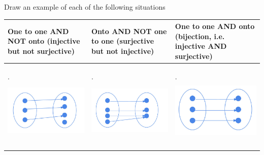 \question Draw an example of each of the following situations \newline
{\tabulinesep=1mm
\begin{tabu}{|p{5cm} | p{5cm}| p{5cm}|}
\hline
One to one AND NOT onto (injective but not surjective) & Onto 
AND NOT one to one (surjective but not injective) & One to one 
AND onto (bijection, i.e. injective AND surjective)\\  
\hline
\begin{solution}[1 in] .\newline \includegraphics[width=4.5cm, height=30mm]{draw_injection.jpg} 
\end{solution} &  \begin{solution}[1 in] .\newline  \includegraphics[width=4.5cm, height=30mm]{draw_surjection.jpg} \end{solution} &  \begin{solution}[1 in] .\newline \includegraphics[width=4.5cm, height=30mm]{draw_bijection.jpg} \end{solution} \\
\hline
\end{tabu}
}